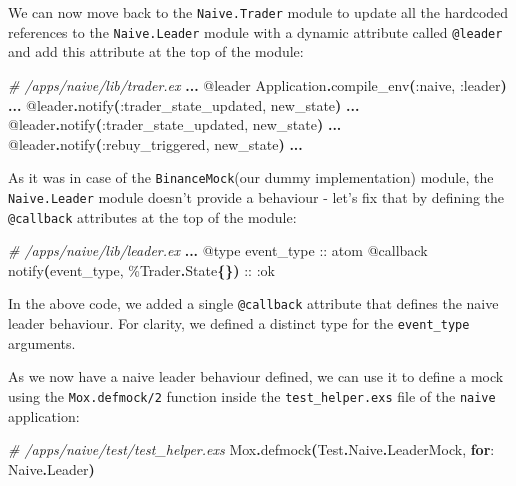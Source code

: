 \documentclass[
  oneside]{book}
\newenvironment{Shaded}{\begin{snugshade}}{\end{snugshade}}
\newcommand{\CommentTok}[1]{\textcolor[rgb]{0.56,0.35,0.01}{\textit{#1}}}
\newcommand{\ConstantTok}[1]{\textcolor[rgb]{0.56,0.35,0.01}{#1}}
\newcommand{\FunctionTok}[1]{\textcolor[rgb]{0.13,0.29,0.53}{\textbf{#1}}}
\newcommand{\KeywordTok}[1]{\textcolor[rgb]{0.13,0.29,0.53}{\textbf{#1}}}
\newcommand{\NormalTok}[1]{#1}
\newcommand{\OperatorTok}[1]{\textcolor[rgb]{0.81,0.36,0.00}{\textbf{#1}}}
\newcommand{\OtherTok}[1]{\textcolor[rgb]{0.56,0.35,0.01}{#1}}
\newcommand{\VariableTok}[1]{\textcolor[rgb]{0.00,0.00,0.00}{#1}}
\begin{document}
We can now move back to the \texttt{Naive.Trader} module to update all the hardcoded references to the \texttt{Naive.Leader} module with a dynamic attribute called \texttt{@leader} and add this attribute at the top of the module:

\begin{Shaded}
\begin{Highlighting}[]
\CommentTok{\# /apps/naive/lib/trader.ex}
  \OperatorTok{...}
  \OtherTok{@leader} \ConstantTok{Application}\OperatorTok{.}\NormalTok{compile\_env}\FunctionTok{(}\VariableTok{:naive}\NormalTok{, }\VariableTok{:leader}\FunctionTok{)}
  \OperatorTok{...}
  \OtherTok{@leader}\OperatorTok{.}\NormalTok{notify}\FunctionTok{(}\VariableTok{:trader\_state\_updated}\NormalTok{, new\_state}\FunctionTok{)}
  \OperatorTok{...}
  \OtherTok{@leader}\OperatorTok{.}\NormalTok{notify}\FunctionTok{(}\VariableTok{:trader\_state\_updated}\NormalTok{, new\_state}\FunctionTok{)}
  \OperatorTok{...}
  \OtherTok{@leader}\OperatorTok{.}\NormalTok{notify}\FunctionTok{(}\VariableTok{:rebuy\_triggered}\NormalTok{, new\_state}\FunctionTok{)}
  \OperatorTok{...}
\end{Highlighting}
\end{Shaded}

As it was in case of the \texttt{BinanceMock}(our dummy implementation) module, the \texttt{Naive.Leader} module doesn't provide a behaviour - let's fix that by defining the \texttt{@callback} attributes at the top of the module:

\begin{Shaded}
\begin{Highlighting}[]
\CommentTok{\# /apps/naive/lib/leader.ex}
  \OperatorTok{...}
  \OtherTok{@type}\NormalTok{ event\_type :: atom}
  \OtherTok{@callback}\NormalTok{ notify}\FunctionTok{(}\NormalTok{event\_type, \%}\ConstantTok{Trader}\OperatorTok{.}\ConstantTok{State}\FunctionTok{\{\})}\NormalTok{ :: }\VariableTok{:ok}
\end{Highlighting}
\end{Shaded}

In the above code, we added a single \texttt{@callback} attribute that defines the naive leader behaviour. For clarity, we defined a distinct type for the \texttt{event\_type} arguments.

As we now have a naive leader behaviour defined, we can use it to define a mock using the \texttt{Mox.defmock/2} function inside the \texttt{test\_helper.exs} file of the \texttt{naive} application:

\begin{Shaded}
\begin{Highlighting}[]
\CommentTok{\# /apps/naive/test/test\_helper.exs}
\ConstantTok{Mox}\OperatorTok{.}\NormalTok{defmock}\FunctionTok{(}\ConstantTok{Test}\OperatorTok{.}\ConstantTok{Naive}\OperatorTok{.}\ConstantTok{LeaderMock}\NormalTok{, }\KeywordTok{for}\NormalTok{: }\ConstantTok{Naive}\OperatorTok{.}\ConstantTok{Leader}\FunctionTok{)}
\end{Highlighting}
\end{Shaded}
\end{document}
